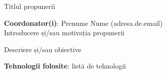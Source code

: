 \documentclass[diploma]{proposal.cs.pub.ro}
\begin{document}
{\Large Titlul propunerii}

\textbf{Coordonator(i)}: Prenume Nume (adresa.de.email)
\\


Introducere și/sau motivația propunerii

Descriere și/sau obiective

\textbf{Tehnologii folosite}: listă de tehnologii

\end{document}
